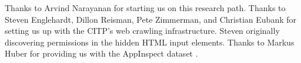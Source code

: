 \documentclass{sig-alternate}
\newcommand{\extendedversion}[2]{#2}
\begin{document}
Thanks to Arvind Narayanan for starting us on this research path. Thanks to Steven Englehardt, Dillon Reisman, Pete Zimmerman, and Christian Eubank for setting us up with the CITP's web crawling infrastructure. Steven originally discovering permissions in the hidden HTML input elements. Thanks to Markus Huber for providing us with the AppInspect dataset \cite{appinspect}.




\extendedversion{
\appendix
\section{Full message decoding tables}
\label{appendix:decodetables}

\begin{table}[h!]
  \centering
  \begin{tabular}{|l|l|l|}
    \hline


\end{tabular}
\end{table}}
\end{document}
